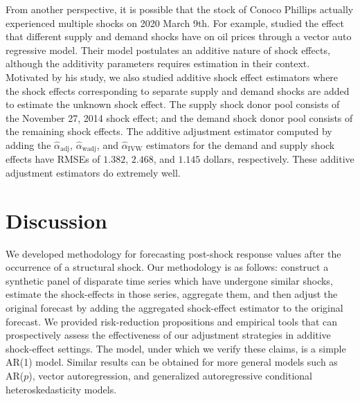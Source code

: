 \documentclass[11pt]{article}
\theoremstyle{definition}
\begin{document}
From another perspective, it is possible that the stock of Conoco Phillips actually experienced multiple shocks on 2020 March 9th. For example, \citet{kilian2009not} studied the effect that different supply and demand shocks have on oil prices through a vector auto regressive model. Their model postulates an additive nature of shock effects, although the additivity parameters requires estimation in their context. Motivated by his study, we also studied additive shock effect estimators where the shock effects corresponding to separate supply and demand shocks are added to estimate the unknown shock effect. The supply shock donor pool consists of the November 27, 2014 shock effect; and the demand shock donor pool consists of the remaining shock effects. The additive adjustment estimator computed by adding the $\hat{\alpha}_{\text{adj}}$, $\hat{\alpha}_{\text{wadj}}$, and $\hat{\alpha}_{\text{IVW}}$ estimators for the demand and supply shock effects have  RMSEs of $1.382$, $2.468$, and $1.145$ dollars, respectively. These additive adjustment estimators do extremely well. 






\section{Discussion}
\label{discussion}

We developed methodology for forecasting post-shock response values after the occurrence of a structural shock. Our methodology is as follows: construct a synthetic panel of disparate time series which have undergone similar shocks, estimate the shock-effects in those series, aggregate them, and then adjust the original forecast by adding the aggregated shock-effect estimator to the original forecast. We provided risk-reduction propositions and empirical tools that can prospectively assess the effectiveness of our adjustment strategies in additive shock-effect settings. The model, under which we verify these claims, is a simple AR(1) model. Similar results can be obtained for more general models such as AR($p$), vector autoregression, and generalized autoregressive conditional heteroskedasticity models. %
\end{document}
